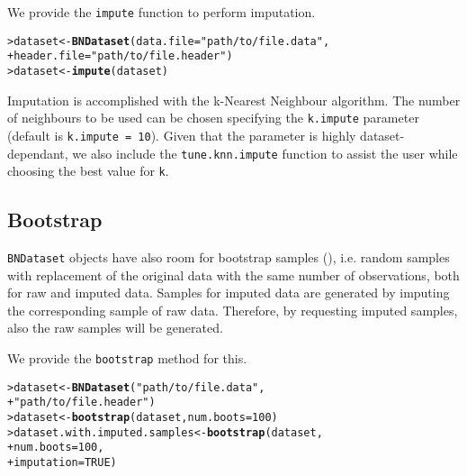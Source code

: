 \documentclass{article}\usepackage[]{graphicx}\usepackage[]{color}
\makeatletter
\newcommand{\hlnum}[1]{\textcolor[rgb]{0.686,0.059,0.569}{#1}}%
\newcommand{\hlstr}[1]{\textcolor[rgb]{0.192,0.494,0.8}{#1}}%
\newcommand{\hlstd}[1]{\textcolor[rgb]{0.345,0.345,0.345}{#1}}%
\newcommand{\hlkwb}[1]{\textcolor[rgb]{0.69,0.353,0.396}{#1}}%
\newcommand{\hlkwc}[1]{\textcolor[rgb]{0.333,0.667,0.333}{#1}}%
\newcommand{\hlkwd}[1]{\textcolor[rgb]{0.737,0.353,0.396}{\textbf{#1}}}%
\newenvironment{kframe}{%
 \def\at@end@of@kframe{}%
 \ifinner\ifhmode%
  \def\at@end@of@kframe{\end{minipage}}%
  \begin{minipage}{\columnwidth}%
 \fi\fi%
 \def\FrameCommand##1{\hskip\@totalleftmargin \hskip-\fboxsep
 \colorbox{shadecolor}{##1}\hskip-\fboxsep
     \hskip-\linewidth \hskip-\@totalleftmargin \hskip\columnwidth}%
 \MakeFramed {\advance\hsize-\width
   \@totalleftmargin\z@ \linewidth\hsize
   \@setminipage}}%
 {\par\unskip\endMakeFramed%
 \at@end@of@kframe}
\newenvironment{knitrout}{}{} %
\newcommand{\Robject}[1]{{\texttt{#1}}}
\newcommand{\Rmethod}[1]{{\texttt{#1}}}
\newcommand{\Rfunarg}[1]{{\texttt{#1}}}
\makeatother
\begin{document}
We provide the \Rmethod{impute} function to perform imputation.
\begin{knitrout}
\color{fgcolor}\begin{kframe}
\begin{alltt}
\hlstd{> }\hlstd{dataset} \hlkwb{<-} \hlkwd{BNDataset}\hlstd{(}\hlkwc{data.file}   \hlstd{=} \hlstr{"path/to/file.data"}\hlstd{,}
\hlstd{+ }                     \hlkwc{header.file} \hlstd{=} \hlstr{"path/to/file.header"}\hlstd{)}
\hlstd{> }\hlstd{dataset} \hlkwb{<-} \hlkwd{impute}\hlstd{(dataset)}
\end{alltt}
\end{kframe}
\end{knitrout}

Imputation is accomplished with the k-Nearest Neighbour algorithm. The number of neighbours to be used
can be chosen specifying the \Rfunarg{k.impute} parameter (default is \Rfunarg{k.impute = 10}). Given that
the parameter is highly dataset-dependant, we also include the \Rmethod{tune.knn.impute} function to assist
the user while choosing the best value for \Rfunarg{k}.

\subsection{Bootstrap}
\Robject{BNDataset} objects have also room for bootstrap samples (\citet{efron1994introduction}), i.e. random samples with replacement of the original data
with the same number of observations, both for raw and imputed data.
Samples for imputed data are generated by imputing the corresponding sample of raw data.
Therefore, by requesting imputed samples, also the raw samples will be generated.

We provide the \Rmethod{bootstrap} method for this.
\begin{knitrout}
\color{fgcolor}\begin{kframe}
\begin{alltt}
\hlstd{> }\hlstd{dataset} \hlkwb{<-} \hlkwd{BNDataset}\hlstd{(}\hlstr{"path/to/file.data"}\hlstd{,}
\hlstd{+ }                     \hlstr{"path/to/file.header"}\hlstd{)}
\hlstd{> }\hlstd{dataset} \hlkwb{<-} \hlkwd{bootstrap}\hlstd{(dataset,} \hlkwc{num.boots} \hlstd{=} \hlnum{100}\hlstd{)}
\hlstd{> }\hlstd{dataset.with.imputed.samples} \hlkwb{<-} \hlkwd{bootstrap}\hlstd{(dataset,}
\hlstd{+ }                                          \hlkwc{num.boots} \hlstd{=} \hlnum{100}\hlstd{,}
\hlstd{+ }                                          \hlkwc{imputation} \hlstd{=} \hlnum{TRUE}\hlstd{)}
\end{alltt}
\end{kframe}
\end{knitrout}
\end{document}
